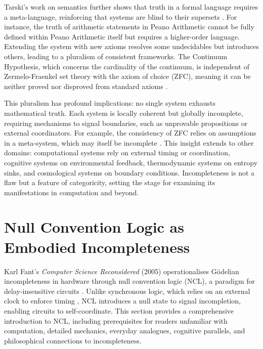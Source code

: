 \documentclass{article}
\begin{document}
Tarski's work on semantics further shows that truth in a formal language requires a meta-language, reinforcing that systems are blind to their supersets \citep{tarski1956}. For instance, the truth of arithmetic statements in Peano Arithmetic cannot be fully defined within Peano Arithmetic itself but requires a higher-order language. Extending the system with new axioms resolves some undecidables but introduces others, leading to a pluralism of consistent frameworks. The Continuum Hypothesis, which concerns the cardinality of the continuum, is independent of Zermelo-Fraenkel set theory with the axiom of choice (ZFC), meaning it can be neither proved nor disproved from standard axioms \citep{godel1931}.

This pluralism has profound implications: no single system exhausts mathematical truth. Each system is locally coherent but globally incomplete, requiring mechanisms to signal boundaries, such as unprovable propositions or external coordinators. For example, the consistency of ZFC relies on assumptions in a meta-system, which may itself be incomplete \citep{nagel1958}. This insight extends to other domains: computational systems rely on external timing or coordination, cognitive systems on environmental feedback, thermodynamic systems on entropy sinks, and cosmological systems on boundary conditions. Incompleteness is not a flaw but a feature of categoricity, setting the stage for examining its manifestations in computation and beyond.

\section{Null Convention Logic as Embodied Incompleteness}
\label{sec:ncl}
Karl Fant's \textit{Computer Science Reconsidered} (2005) operationalises G\"{o}delian incompleteness in hardware through null convention logic (NCL), a paradigm for delay-insensitive circuits \citep{fant2005}. Unlike synchronous logic, which relies on an external clock to enforce timing \citep{seitz1980}, NCL introduces a null state to signal incompletion, enabling circuits to self-coordinate. This section provides a comprehensive introduction to NCL, including prerequisites for readers unfamiliar with computation, detailed mechanics, everyday analogues, cognitive parallels, and philosophical connections to incompleteness.
\end{document}
